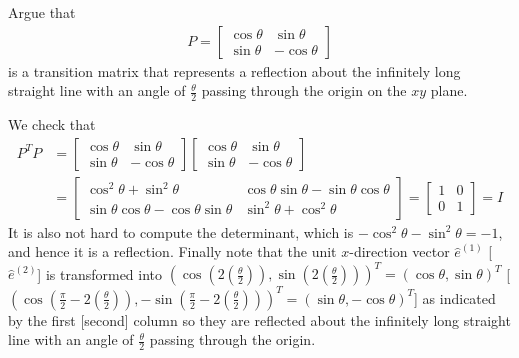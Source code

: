 \begin{Exercise}
Argue that
\begin{align*}
P = 
\begin{bmatrix}
\cos{\theta} & \sin{\theta} \\
\sin{\theta} & -\cos{\theta}
\end{bmatrix}
\end{align*}
is a transition matrix that represents a reflection about the infinitely long straight line with an angle of $\frac{\theta}{2}$ passing through the origin on the $xy$ plane.
\end{Exercise}
\begin{Answer}
We check that
\begin{align*}
P^TP &= 
\begin{bmatrix}
\cos{\theta} & \sin{\theta} \\
\sin{\theta} & -\cos{\theta}
\end{bmatrix}
\begin{bmatrix}
\cos{\theta} & \sin{\theta} \\
\sin{\theta} & -\cos{\theta}
\end{bmatrix} \\
&=
\begin{bmatrix}
\cos^2{\theta} + \sin^2\theta & \cos\theta\sin\theta -\sin\theta\cos\theta \\
\sin\theta\cos\theta-\cos\theta\sin\theta & \sin^2\theta + \cos^2\theta
\end{bmatrix}
=
\begin{bmatrix}
1 & 0\\
0 & 1
\end{bmatrix}
= I
\end{align*}
It is also not hard to compute the determinant, which is $-\cos^2\theta-\sin^2\theta = -1$, and hence it is a reflection. Finally note that the unit $x$-direction vector $\hat{e}^{(1)}$ [$\hat{e}^{(2)}$] is transformed into $(\cos(2(\frac{\theta}{2})), \sin(2(\frac{\theta}{2})))^T = (\cos\theta, \sin\theta)^T$ [$(\cos(\frac{\pi}{2}-2(\frac{\theta}{2})), -\sin(\frac{\pi}{2}-2(\frac{\theta}{2})))^T = (\sin\theta,-\cos\theta)^T$] as indicated by the first [second] column so they are reflected about the infinitely long straight line with an angle of $\frac{\theta}{2}$ passing through the origin.
\end{Answer}

